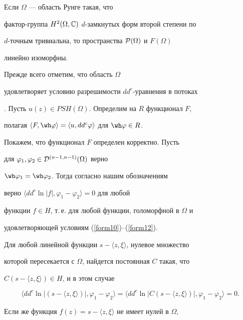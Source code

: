 \begin{thm}\label{theor4}


Если $\Omega$ --- область Рунге такая, что 


фактор-группа $H^2(\Omega, \Bbb C)$ $d$-замкнутых форм второй степени по 


$d$-точным тривиальна, то пространства ${\cal P}(\Omega)$ и $F(\Omega)$ 


линейно изоморфны. 


\end{thm}





\begin{pf}


Прежде всего отметим, что область $\Omega$ 


удовлетворяет условию разрешимости $dd^c$-уравнения в потоках 


\cite{Chirk2}. Пусть $u(z)\in PSH(\Omega)$. Определим на $R$ функционал $F$, 


полагая  $\langle F, \wh \varphi\rangle=\langle u, 


dd^c\varphi\rangle$ для $\wh\varphi\in R$.


Покажем, что функционал $F$ определен корректно. Пусть 


для $\varphi_1, \varphi_2\in {\cal D}^{(n-1,n-1)}(\Omega)$ верно 


$\wh\varphi_1=\wh\varphi_2$. Тогда согласно нашим обозначениям 


верно $\langle dd^c\ln|f|,\varphi_1-\varphi_2\rangle=0$ для любой 


функции $f\in H$, т.\,е. для любой функции, голоморфной в $\Omega$ и 


удовлетворяющей условиям (\ref{form10})--(\ref{form12}).


Для любой линейной функции $s-\langle z, \xi\rangle$, нулевое множество 


которой пересекается с $\Omega$, найдется постоянная $C$ такая, что 


$C(s-\langle z, \xi\rangle)\in H$, и в этом случае 


$$


\langle dd^c\ln|(s-\langle z, \xi\rangle)|,\varphi_1-\varphi_2\rangle=


\langle dd^c\ln|C(s-\langle z, \xi\rangle)|,\varphi_1-\varphi_2\rangle=0.


$$


Если же функция $f(z)=s-\langle z, \xi\rangle$ не имеет нулей в $\Omega$, 



\end{pf}
